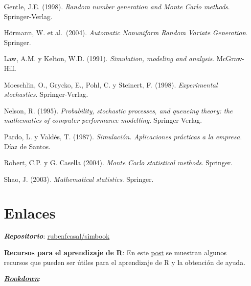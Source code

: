 \documentclass[
  spanish,
  10pt,
]{book}
\theoremstyle{break}
\theoremstyle{nonumberplain}
\begin{document}
Gentle, J.E. (1998). \emph{Random number generation and Monte Carlo methods}. Springer-Verlag.

Hörmann, W. et al.~(2004). \emph{Automatic Nonuniform Random Variate Generation}. Springer.

Law, A.M. y Kelton, W.D. (1991). \emph{Simulation, modeling and analysis}. McGraw-Hill.

Moeschlin, O., Grycko, E., Pohl, C. y Steinert, F. (1998). \emph{Experimental stochastics}. Springer-Verlag.

Nelson, R. (1995). \emph{Probability, stochastic processes, and queueing theory: the mathematics of computer performance modelling}. Springer-Verlag.

Pardo, L. y Valdés, T. (1987). \emph{Simulación. Aplicaciones prácticas a la empresa}. Díaz de Santos.

Robert, C.P. y G. Casella (2004). \emph{Monte Carlo statistical methods}. Springer.

Shao, J. (2003). \emph{Mathematical statistics}. Springer.

\section*{Enlaces}\label{links}

\textbf{\emph{Repositorio}}: \href{https://github.com/rubenfcasal/simbook}{rubenfcasal/simbook}

\textbf{Recursos para el aprendizaje de R}: En este \href{https://rubenfcasal.github.io/post/ayuda-y-recursos-para-el-aprendizaje-de-r}{post} se muestran algunos recursos que pueden ser útiles para el aprendizaje de R y la obtención de ayuda.

\href{https://bookdown.org}{\textbf{\emph{Bookdown}}}:
\end{document}
